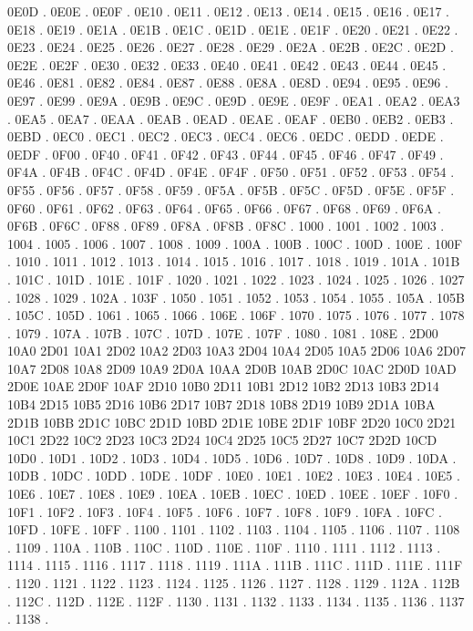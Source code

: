 0E0D .
0E0E .
0E0F .
0E10 .
0E11 .
0E12 .
0E13 .
0E14 .
0E15 .
0E16 .
0E17 .
0E18 .
0E19 .
0E1A .
0E1B .
0E1C .
0E1D .
0E1E .
0E1F .
0E20 .
0E21 .
0E22 .
0E23 .
0E24 .
0E25 .
0E26 .
0E27 .
0E28 .
0E29 .
0E2A .
0E2B .
0E2C .
0E2D .
0E2E .
0E2F .
0E30 .
0E32 .
0E33 .
0E40 .
0E41 .
0E42 .
0E43 .
0E44 .
0E45 .
0E46 .
0E81 .
0E82 .
0E84 .
0E87 .
0E88 .
0E8A .
0E8D .
0E94 .
0E95 .
0E96 .
0E97 .
0E99 .
0E9A .
0E9B .
0E9C .
0E9D .
0E9E .
0E9F .
0EA1 .
0EA2 .
0EA3 .
0EA5 .
0EA7 .
0EAA .
0EAB .
0EAD .
0EAE .
0EAF .
0EB0 .
0EB2 .
0EB3 .
0EBD .
0EC0 .
0EC1 .
0EC2 .
0EC3 .
0EC4 .
0EC6 .
0EDC .
0EDD .
0EDE .
0EDF .
0F00 .
0F40 .
0F41 .
0F42 .
0F43 .
0F44 .
0F45 .
0F46 .
0F47 .
0F49 .
0F4A .
0F4B .
0F4C .
0F4D .
0F4E .
0F4F .
0F50 .
0F51 .
0F52 .
0F53 .
0F54 .
0F55 .
0F56 .
0F57 .
0F58 .
0F59 .
0F5A .
0F5B .
0F5C .
0F5D .
0F5E .
0F5F .
0F60 .
0F61 .
0F62 .
0F63 .
0F64 .
0F65 .
0F66 .
0F67 .
0F68 .
0F69 .
0F6A .
0F6B .
0F6C .
0F88 .
0F89 .
0F8A .
0F8B .
0F8C .
1000 .
1001 .
1002 .
1003 .
1004 .
1005 .
1006 .
1007 .
1008 .
1009 .
100A .
100B .
100C .
100D .
100E .
100F .
1010 .
1011 .
1012 .
1013 .
1014 .
1015 .
1016 .
1017 .
1018 .
1019 .
101A .
101B .
101C .
101D .
101E .
101F .
1020 .
1021 .
1022 .
1023 .
1024 .
1025 .
1026 .
1027 .
1028 .
1029 .
102A .
103F .
1050 .
1051 .
1052 .
1053 .
1054 .
1055 .
105A .
105B .
105C .
105D .
1061 .
1065 .
1066 .
106E .
106F .
1070 .
1075 .
1076 .
1077 .
1078 .
1079 .
107A .
107B .
107C .
107D .
107E .
107F .
1080 .
1081 .
108E .
2D00 10A0
2D01 10A1
2D02 10A2
2D03 10A3
2D04 10A4
2D05 10A5
2D06 10A6
2D07 10A7
2D08 10A8
2D09 10A9
2D0A 10AA
2D0B 10AB
2D0C 10AC
2D0D 10AD
2D0E 10AE
2D0F 10AF
2D10 10B0
2D11 10B1
2D12 10B2
2D13 10B3
2D14 10B4
2D15 10B5
2D16 10B6
2D17 10B7
2D18 10B8
2D19 10B9
2D1A 10BA
2D1B 10BB
2D1C 10BC
2D1D 10BD
2D1E 10BE
2D1F 10BF
2D20 10C0
2D21 10C1
2D22 10C2
2D23 10C3
2D24 10C4
2D25 10C5
2D27 10C7
2D2D 10CD
10D0 .
10D1 .
10D2 .
10D3 .
10D4 .
10D5 .
10D6 .
10D7 .
10D8 .
10D9 .
10DA .
10DB .
10DC .
10DD .
10DE .
10DF .
10E0 .
10E1 .
10E2 .
10E3 .
10E4 .
10E5 .
10E6 .
10E7 .
10E8 .
10E9 .
10EA .
10EB .
10EC .
10ED .
10EE .
10EF .
10F0 .
10F1 .
10F2 .
10F3 .
10F4 .
10F5 .
10F6 .
10F7 .
10F8 .
10F9 .
10FA .
10FC .
10FD .
10FE .
10FF .
1100 .
1101 .
1102 .
1103 .
1104 .
1105 .
1106 .
1107 .
1108 .
1109 .
110A .
110B .
110C .
110D .
110E .
110F .
1110 .
1111 .
1112 .
1113 .
1114 .
1115 .
1116 .
1117 .
1118 .
1119 .
111A .
111B .
111C .
111D .
111E .
111F .
1120 .
1121 .
1122 .
1123 .
1124 .
1125 .
1126 .
1127 .
1128 .
1129 .
112A .
112B .
112C .
112D .
112E .
112F .
1130 .
1131 .
1132 .
1133 .
1134 .
1135 .
1136 .
1137 .
1138 .
